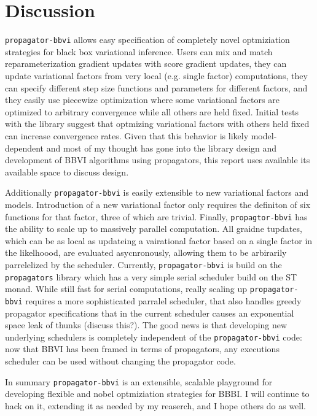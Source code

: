 \documentclass[12pt]{article}
\begin{document}
\section{Discussion}

\texttt{propagator-bbvi} allows easy specification of completely novel
optmiziation strategies for black box variational inference. Users can
mix and match reparameterization gradient updates with score gradient
updates, they can update variational factors from very local
(e.g. single factor) computations, they can specify different step
size functions and parameters for different factors, and they easily use
piecewize optimization where some variational factors are optimized to
arbitrary convergence while all others are held fixed. Initial tests
with the library suggest that optmizing variational factors with
others held fixed can increase convergence rates. Given that this
behavior is likely model-dependent and most of my thought has gone
into the library design and development of BBVI algorithms using
propagators, this report uses available its available space to discuss
design.

Additionally \texttt{propagator-bbvi} is easily extensible to new
variational factors and models. Introduction of a new variational
factor only requires the definiton of six functions for that factor,
three of which are trivial. Finally, \texttt{propagtor-bbvi} has the
ability to scale up to massively parallel computation. All graidne
tupdates, which can be as local as updateing a vairational factor
based on a single factor in the likelhoood, are evaluated
asycnronously, allowing them to be arbirarily parrelelized by the
scheduler. Currently, \texttt{propagator-bbvi} is build on the
\texttt{propagators} library which has a very simple serial scheduler
build on the ST monad. While still fast for serial computations,
really scaling up \texttt{propagator-bbvi} requires a more
sophisticated parralel scheduler, that also handles greedy propagator
specifications that in the current scheduler causes an exponential
space leak of thunks (discuss this?). The good news is that developing
new underlying schedulers is completely independent of the
\texttt{propagator-bbvi} code: now that BBVI has been framed in terms
of propagators, any executions scheduler can be used without changing
the propagator code.

In summary \texttt{propagator-bbvi} is an extensible, scalable
playground for developing flexible and nobel optmiziation strategies
for BBBI. I will continue to hack on it, extending it as needed by my
reaserch, and I hope others do as well.


\end{document}
